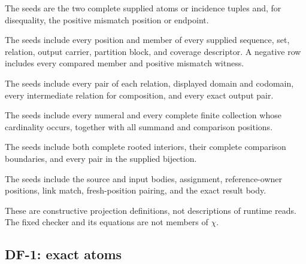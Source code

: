 \documentclass[11pt,twoside]{article}
\begin{document}
\begin{description}[leftmargin=3.3em,style=nextline]
  \item[\(\mathsf{PA}\) --- exact atoms.]
    The seeds are the two complete supplied atoms or incidence tuples and, for
    disequality, the positive mismatch position or endpoint.
  \item[\(\mathsf{PC}\) --- finite carriers.]
    The seeds include every position and member of every supplied sequence, set,
    relation, output carrier, partition block, and coverage descriptor.  A negative
    row includes every compared member and positive mismatch witness.
  \item[\(\mathsf{PM}\) --- finite relation maps.]
    The seeds include every pair of each relation, displayed domain and codomain,
    every intermediate relation for composition, and every exact output pair.
  \item[\(\mathsf{PN}\) --- finite measures.]
    The seeds include every numeral and every complete finite collection whose
    cardinality occurs, together with all summand and comparison positions.
  \item[\(\mathsf{PI}\) --- structural isomorphism.]
    The seeds include both complete rooted interiors, their complete comparison
    boundaries, and every pair in the supplied bijection.
  \item[\(\mathsf{PP}\) --- application.]
    The seeds include the source and input bodies, assignment, reference-owner
    positions, link match, fresh-position pairing, and the exact result body.
\end{description}

These are constructive projection definitions, not descriptions of runtime reads.
The fixed checker and its equations are not members of \(\chi\).

\subsection{DF-1: exact atoms}\label{sec:df1}
\end{document}
